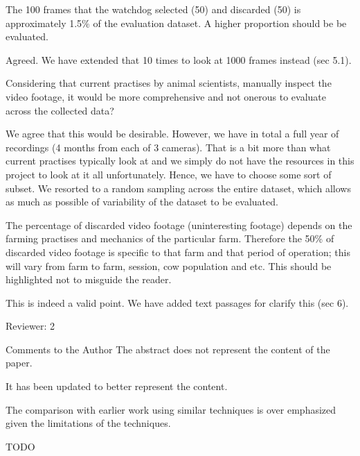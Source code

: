 \documentclass[10pt,a4paper]{letter}
\begin{document}
\begin{letter}{}
\begin{siderules}
The 100 frames that the watchdog selected (50) and discarded (50) is approximately 1.5\% of the evaluation dataset. 
A higher proportion should be be evaluated. 
\end{siderules}

Agreed. We have extended that 10 times to look at 1000 frames instead (sec 5.1).

\begin{siderules}
Considering that current practises by animal scientists, manually inspect the video footage, it would be more 
comprehensive and not onerous to evaluate across the collected data?
\end{siderules}

We agree that this would be desirable. However, we have in total a full year of recordings (4 months from each of 3 cameras). 
That is a bit more than what current practises typically look at and
we simply do not have the resources in this project to look at it all unfortunately. 
Hence, we have to choose some sort of subset. We resorted to a random sampling across the
entire dataset, which allows as much as possible of variability of the dataset to be evaluated.

\begin{siderules}
The percentage of discarded video footage (uninteresting footage) depends on the farming practises and mechanics of the particular farm. Therefore the 50\% of discarded video footage is specific to that farm and that period of operation; this will vary from farm to farm, session, cow population and etc. This should be highlighted not to misguide the reader.
\end{siderules}

This is indeed a valid point. We have added text passages for clarify this (sec 6).

\begin{siderules}
Reviewer: 2

Comments to the Author
The abstract does not represent the content of the paper.
\end{siderules}

It has been updated to better represent the content.

\begin{siderules}
The comparison with earlier work using similar techniques is over emphasized given the limitations
of the techniques.
\end{siderules}

TODO


\end{letter}
\end{document}
